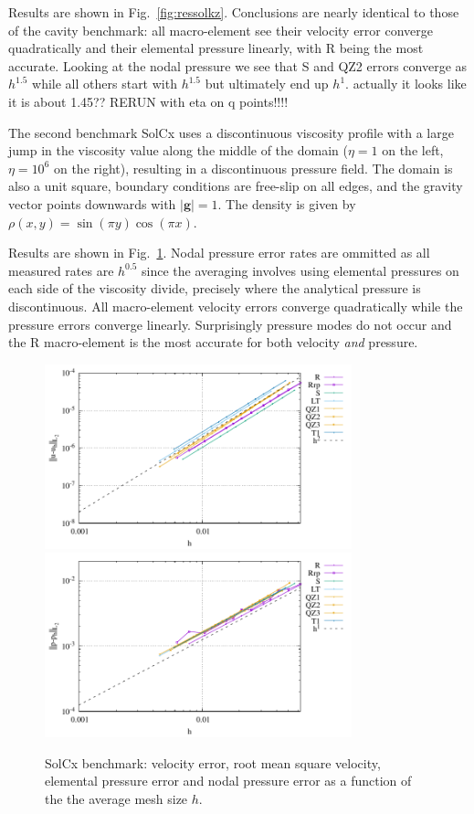 \documentclass[a4paper,12pt]{article}
\begin{document}
Results are shown in Fig.~\ref{fig:ressolkz}.
Conclusions are nearly identical to those of the cavity benchmark:
all macro-element see their velocity error converge quadratically 
and their elemental pressure linearly, with R being the most accurate.
Looking at the nodal pressure we see that S and QZ2 errors converge as $h^{1.5}$
while all others start with $h^{1.5}$ but ultimately end up $h^1$. 
{\color{red} actually it looks like it is about 1.45??
RERUN with eta on q points!!!!}

The second benchmark SolCx uses a discontinuous viscosity profile with a large jump in
the viscosity value along the middle of the domain ($\eta=1$ on the left,
$\eta=10^6$ on the right), resulting in a discontinuous pressure field. 
The domain is also a unit square, boundary conditions are free-slip on all edges, and
the gravity vector points downwards with $|{\bm g}| = 1$. 
The density is given by $\rho(x,y) = \sin(\pi y) \cos(\pi x)$.

Results are shown in Fig.~\ref{fig:ressolcx}.
Nodal pressure error rates are ommitted as all 
measured rates are $h^{0.5}$ since the averaging 
involves using elemental pressures on each side of the viscosity divide,
precisely where the analytical pressure is discontinuous.
All macro-element velocity errors converge quadratically 
while the pressure errors converge linearly.
Surprisingly pressure modes do not occur and the R macro-element
is the most accurate for both velocity {\it and} pressure.

\begin{figure}
\centering
\includegraphics[width=8.9cm]{../results/errors_u_exp13}
\includegraphics[width=8.9cm]{../results/errors_p_exp13}
\caption{SolCx benchmark: velocity error, 
root mean square velocity, elemental pressure error and nodal pressure error
as a function of the the average mesh size $h$.} 
\label{fig:ressolcx}
\end{figure}
\end{document}
